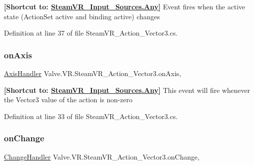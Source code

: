 {\bfseries{\mbox{[}Shortcut to\+: \mbox{\hyperlink{namespace_valve_1_1_v_r_a82e5bf501cc3aa155444ee3f0662853faed36a1ef76a59ee3f15180e0441188ad}{Steam\+V\+R\+\_\+\+Input\+\_\+\+Sources.\+Any}}\mbox{]}}} Event fires when the active state (Action\+Set active and binding active) changes 



Definition at line 37 of file Steam\+V\+R\+\_\+\+Action\+\_\+\+Vector3.\+cs.

\mbox{\label{class_valve_1_1_v_r_1_1_steam_v_r___action___vector3_a8bf8b824979af5005bc7d2b379781ee4}} 
\subsubsection{\texorpdfstring{onAxis}{onAxis}}
{\footnotesize\ttfamily \mbox{\hyperlink{class_valve_1_1_v_r_1_1_steam_v_r___action___vector3_a9b135b663b22c421dc36dbc48d2d35b6}{Axis\+Handler}} Valve.\+V\+R.\+Steam\+V\+R\+\_\+\+Action\+\_\+\+Vector3.\+on\+Axis\hspace{0.3cm}{\ttfamily [add]}, {\ttfamily [remove]}}



{\bfseries{\mbox{[}Shortcut to\+: \mbox{\hyperlink{namespace_valve_1_1_v_r_a82e5bf501cc3aa155444ee3f0662853faed36a1ef76a59ee3f15180e0441188ad}{Steam\+V\+R\+\_\+\+Input\+\_\+\+Sources.\+Any}}\mbox{]}}} This event will fire whenever the Vector3 value of the action is non-\/zero 



Definition at line 33 of file Steam\+V\+R\+\_\+\+Action\+\_\+\+Vector3.\+cs.

\mbox{\label{class_valve_1_1_v_r_1_1_steam_v_r___action___vector3_a9617101f10185cceb79de772bff1bd9b}} 
\subsubsection{\texorpdfstring{onChange}{onChange}}
{\footnotesize\ttfamily \mbox{\hyperlink{class_valve_1_1_v_r_1_1_steam_v_r___action___vector3_a78943f89733a1c1a8e12cb4896e65907}{Change\+Handler}} Valve.\+V\+R.\+Steam\+V\+R\+\_\+\+Action\+\_\+\+Vector3.\+on\+Change\hspace{0.3cm}{\ttfamily [add]}, {\ttfamily [remove]}}



